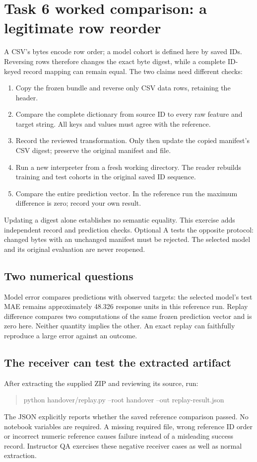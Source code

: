 \section{Task 6 worked comparison: a legitimate row reorder}
A CSV's bytes encode row order; a model cohort is defined here by saved IDs. Reversing rows therefore changes the exact byte digest, while a complete ID-keyed record mapping can remain equal. The two claims need different checks:
\begin{enumerate}
\item Copy the frozen bundle and reverse only CSV data rows, retaining the header.
\item Compare the complete dictionary from source ID to every raw feature and target string. All keys and values must agree with the reference.
\item Record the reviewed transformation. Only then update the copied manifest's CSV digest; preserve the original manifest and file.
\item Run a new interpreter from a fresh working directory. The reader rebuilds training and test cohorts in the original saved ID sequence.
\item Compare the entire prediction vector. In the reference run the maximum difference is zero; record your own result.
\end{enumerate}
Updating a digest alone establishes no semantic equality. This exercise adds independent record and prediction checks. Optional A tests the opposite protocol: changed bytes with an unchanged manifest must be rejected. The selected model and its original evaluation are never reopened.

\subsection{Two numerical questions}
Model error compares predictions with observed targets: the selected model's test MAE remains approximately 48.326 response units in this reference run. Replay difference compares two computations of the same frozen prediction vector and is zero here. Neither quantity implies the other. An exact replay can faithfully reproduce a large error against an outcome.

\subsection{The receiver can test the extracted artifact}
After extracting the supplied ZIP and reviewing its source, run:
\begin{quote}\ttfamily\small
python handover/replay.py --root handover --out replay-result.json
\end{quote}
The JSON explicitly reports whether the saved reference comparison passed. No notebook variables are required. A missing required file, wrong reference ID order or incorrect numeric reference causes failure instead of a misleading success record. Instructor QA exercises these negative receiver cases as well as normal extraction.

